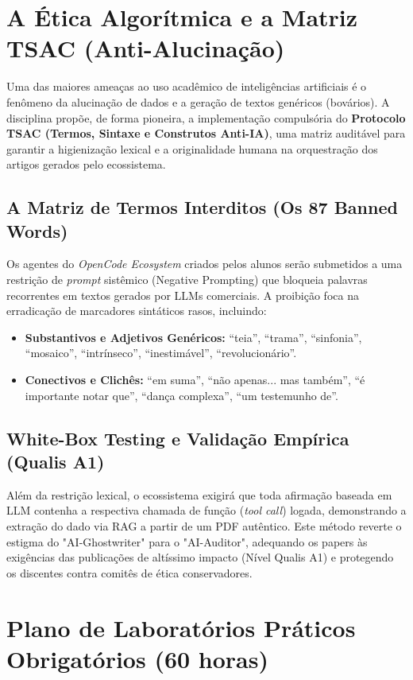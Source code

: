 \documentclass[12pt,a4paper]{article}
\begin{document}
\newpage
\section{A Ética Algorítmica e a Matriz TSAC (Anti-Alucinação)}

Uma das maiores ameaças ao uso acadêmico de inteligências artificiais é o fenômeno da alucinação de dados e a geração de textos genéricos (bovários). A disciplina propõe, de forma pioneira, a implementação compulsória do \textbf{Protocolo TSAC (Termos, Sintaxe e Construtos Anti-IA)}, uma matriz auditável para garantir a higienização lexical e a originalidade humana na orquestração dos artigos gerados pelo ecossistema.

\subsection{A Matriz de Termos Interditos (Os 87 Banned Words)}
Os agentes do \textit{OpenCode Ecosystem} criados pelos alunos serão submetidos a uma restrição de \textit{prompt} sistêmico (Negative Prompting) que bloqueia palavras recorrentes em textos gerados por LLMs comerciais. A proibição foca na erradicação de marcadores sintáticos rasos, incluindo:
\begin{itemize}
    \item \textbf{Substantivos e Adjetivos Genéricos:} ``teia'', ``trama'', ``sinfonia'', ``mosaico'', ``intrínseco'', ``inestimável'', ``revolucionário''.
    \item \textbf{Conectivos e Clichês:} ``em suma'', ``não apenas... mas também'', ``é importante notar que'', ``dança complexa'', ``um testemunho de''.
\end{itemize}

\subsection{White-Box Testing e Validação Empírica (Qualis A1)}
Além da restrição lexical, o ecossistema exigirá que toda afirmação baseada em LLM contenha a respectiva chamada de função (\textit{tool call}) logada, demonstrando a extração do dado via RAG a partir de um PDF autêntico. Este método reverte o estigma do "AI-Ghostwriter" para o "AI-Auditor", adequando os papers às exigências das publicações de altíssimo impacto (Nível Qualis A1) e protegendo os discentes contra comitês de ética conservadores.

\newpage
\section{Plano de Laboratórios Práticos Obrigatórios (60 horas)}
\end{document}
